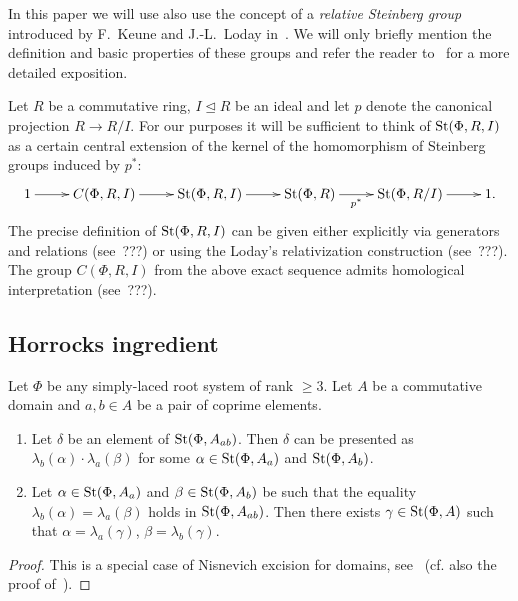 In this paper we will use also use the concept of a \textit{relative Steinberg group} introduced by F.~Keune and J.-L.~Loday in~\cite{Ke78, Lo78}.
We will only briefly mention the definition and basic properties of these groups and refer the reader to~\cite[\S~2.3]{LS20} for a more detailed exposition.

Let $R$ be a commutative ring, $I \trianglelefteq R$ be an ideal and let $p$ denote the canonical projection $R \to R/I$.
For our purposes it will be sufficient to think of $\operatorname{St}(\Phi, R, I)$ as a certain central extension of
 the kernel of the homomorphism of Steinberg groups induced by $p^*$:
\begin{equation}
    \xymatrix{1 \ar[r] & C(\Phi, R, I) \ar[r] & \St(\Phi, R, I) \ar[r] & \St(\Phi, R) \ar[r]_-{p^*} & \St(\Phi, R/I) \ar[r] & 1. }\label{eq:relative-Steinberg}
\end{equation}
The precise definition of $\operatorname{St}(\Phi, R, I)$ can be given either explicitly via generators and relations (see~???)
 or using the Loday's relativization construction (see~???).
The group $C(\Phi, R, I)$ from the above exact sequence admits homological interpretation (see~???).


\subsection{Horrocks ingredient}\label{subsec:horrocks-ingredient}
\begin{lemma} \label{lem:zariski-glueing}
Let $\Phi$ be any simply-laced root system of rank $\geq 3$.
Let $A$ be a commutative domain and $a, b \in A$ be a pair of coprime elements.
\begin{enumerate}
    \item Let $\delta$ be an element of $\operatorname{St}(\Phi, A_{ab})$.
    Then $\delta$ can be presented as $\lambda_b(\alpha) \cdot \lambda_a(\beta)$ for some
    $\alpha \in \operatorname{St}(\Phi, A_a)$ and \beta \in $\operatorname{St}(\Phi, A_b)$.
    \item  Let $\alpha \in \operatorname{St}(\Phi, A_a)$ and $\beta \in \operatorname{St}(\Phi, A_b)$ be such that the equality $\lambda_b(\alpha) = \lambda_a(\beta)$ holds in $\operatorname{St}(\Phi, A_{ab})$.
    Then there exists $\gamma \in \operatorname{St}(\Phi, A)$ such that $\alpha = \lambda_a(\gamma)$, $\beta = \lambda_b(\gamma)$.
\end{enumerate}

\end{lemma}
\begin{proof}
    This is a special case of Nisnevich excision for domains, see~\cite[Proposition~4.5]{LSV2}
    (cf. also the proof of~\cite[Lemma~2.6]{LSV2}).
\end{proof}

